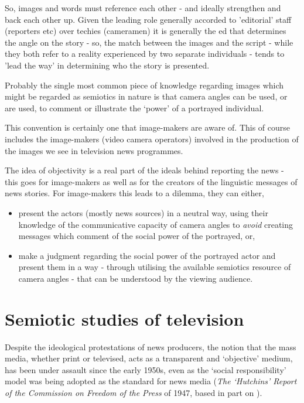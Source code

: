 So, images and words must reference each other - and ideally strengthen and back each other up. Given the leading role generally accorded to 'editorial' staff (reporters etc) over techies (cameramen) it is generally the ed that determines the angle on the story - so, the match between the images and the script - while they both refer to a reality experienced by two separate individuals - tends to 'lead the way' in determining who the story is presented.

\bigskip

\black

Probably the single most common piece of knowledge regarding images which might be regarded as semiotics in nature is that camera angles can be used, or are used, to comment or illustrate the `power' of a portrayed individual.

This convention is certainly one that image-makers are aware of. This of course includes the image-makers (video camera operators) involved in the production of the images we see in television news programmes. 

The idea of objectivity is a real part of the ideals behind reporting the news - this goes for image-makers as well as for the creators of the linguistic messages of news stories. For image-makers this leads to a dilemma, they can either, 

\begin{itemize}
\item present the actors (mostly news sources) in a neutral way, using their knowledge of the communicative capacity of camera angles to \emph{avoid} creating messages which comment of the social power of the portrayed, or,
\item make a judgment regarding the social power of the portrayed actor and present them in a way - through utilising the available semiotics resource of camera angles - that can be understood by the viewing audience.
\end{itemize}



\section{Semiotic studies of television}

Despite the ideological protestations of news producers, the notion that the mass media, whether print or televised, acts as a transparent and `objective' medium, has been under assault since the early 1950s, even as the `social responsibility' model was being adopted as the standard for news media (\textit{The `Hutchins' Report of the Commission on Freedom of the Press} of 1947, based in part on \citet{Siebert:1956}).

